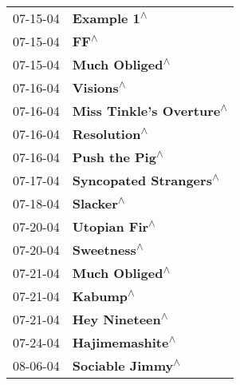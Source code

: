 \begin{supertabular}{p{0.25\columnwidth}p{0.75\columnwidth}}
 07-15-04 &                                                                \textbf{Example 1\textsuperscript{$\wedge$}} \\
 07-15-04 &                                                                       \textbf{FF\textsuperscript{$\wedge$}} \\
 07-15-04 &                                                             \textbf{Much Obliged\textsuperscript{$\wedge$}} \\
 07-16-04 &                                                                  \textbf{Visions\textsuperscript{$\wedge$}} \\
 07-16-04 &                                                   \textbf{Miss Tinkle's Overture\textsuperscript{$\wedge$}} \\
 07-16-04 &                                                               \textbf{Resolution\textsuperscript{$\wedge$}} \\
 07-16-04 &                                                             \textbf{Push the Pig\textsuperscript{$\wedge$}} \\
 07-17-04 &                                                     \textbf{Syncopated Strangers\textsuperscript{$\wedge$}} \\
 07-18-04 &                                                                  \textbf{Slacker\textsuperscript{$\wedge$}} \\
 07-20-04 &                                                              \textbf{Utopian Fir\textsuperscript{$\wedge$}} \\
 07-20-04 &                                                                \textbf{Sweetness\textsuperscript{$\wedge$}} \\
 07-21-04 &                                                             \textbf{Much Obliged\textsuperscript{$\wedge$}} \\
 07-21-04 &                                                                   \textbf{Kabump\textsuperscript{$\wedge$}} \\
 07-21-04 &                                                             \textbf{Hey Nineteen\textsuperscript{$\wedge$}} \\
 07-24-04 &                                                            \textbf{Hajimemashite\textsuperscript{$\wedge$}} \\
 08-06-04 &                                                           \textbf{Sociable Jimmy\textsuperscript{$\wedge$}} \\

\end{supertabular}
